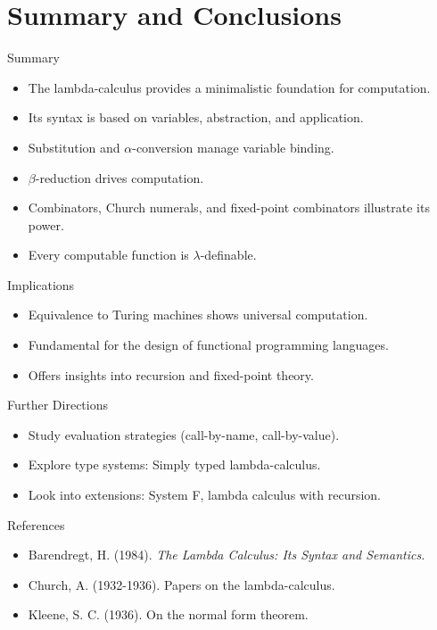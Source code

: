 \documentclass{beamer}
\begin{document}
\section{Summary and Conclusions}
\begin{frame}{Summary}
  \begin{itemize}
    \item The lambda-calculus provides a minimalistic foundation for computation.
    \item Its syntax is based on variables, abstraction, and application.
    \item Substitution and $\alpha$-conversion manage variable binding.
    \item $\beta$-reduction drives computation.
    \item Combinators, Church numerals, and fixed-point combinators illustrate its power.
    \item Every computable function is $\lambda$-definable.
  \end{itemize}
\end{frame}

\begin{frame}{Implications}
  \begin{itemize}
    \item Equivalence to Turing machines shows universal computation.
    \item Fundamental for the design of functional programming languages.
    \item Offers insights into recursion and fixed-point theory.
  \end{itemize}
\end{frame}

\begin{frame}{Further Directions}
  \begin{itemize}
    \item Study evaluation strategies (call-by-name, call-by-value).
    \item Explore type systems: Simply typed lambda-calculus.
    \item Look into extensions: System F, lambda calculus with recursion.
  \end{itemize}
\end{frame}

\begin{frame}{References}
  \begin{itemize}
    \item Barendregt, H. (1984). \textit{The Lambda Calculus: Its Syntax and Semantics.}
    \item Church, A. (1932-1936). Papers on the lambda-calculus.
    \item Kleene, S. C. (1936). On the normal form theorem.
  \end{itemize}
\end{frame}
\end{document}
